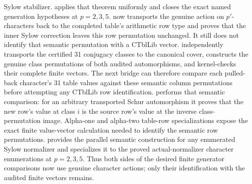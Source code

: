 \documentclass[11pt]{article}
\begin{document}
Sylow stabilizer.
 applies that
theorem uniformly and closes the exact named generation hypotheses at
\(p=2,3,5\).
 now transports the
genuine action on \(p'\)-characters back to the completed table's
arithmetic row type and proves that the inner Sylow correction leaves this
row permutation unchanged.  It still does not identify that semantic
permutation with a CTblLib vector.
 independently
transports the certified 31 conjugacy classes to the canonical cover,
constructs the genuine class permutations of both audited
automorphisms, and kernel-checks their complete finite vectors.  The next
bridge can therefore compare each pulled-back character's 31 table values
against these semantic column permutations before attempting any CTblLib
row identification.
 performs that
semantic comparison: for an arbitrary transported Schur automorphism it
proves that the new row's value at class \(i\) is the source row's value at
the inverse class-permutation image.  Alpha-one and alpha-two table-row
specializations expose the exact finite value-vector calculation needed to
identify the semantic row permutations.
 provides the parallel
semantic construction for any enumerated Sylow normalizer and specializes
it to the proved actual-normalizer character enumerations at
\(p=2,3,5\).  Thus both sides of the desired finite generator comparisons
now use genuine character actions; only their identification with the
audited finite vectors remains.
\end{document}
